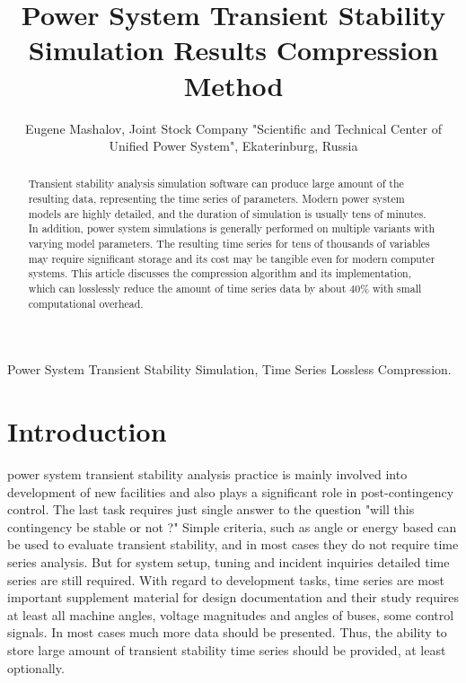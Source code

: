 \documentclass[lettersize,journal]{IEEEtran}
\begin{document}
\title{Power System Transient Stability Simulation Results Compression Method}

\author {Eugene Mashalov, Joint Stock Company "Scientific and Technical Center of Unified Power System", Ekaterinburg, Russia}




\maketitle

\begin{abstract}
Transient stability analysis simulation software can produce large amount of
the resulting data, representing the time series of parameters. Modern power system models
are highly detailed, and the duration of simulation is usually tens of minutes. 
In addition, power system simulations is generally performed on multiple variants with
varying model parameters. The resulting time series for tens of thousands of variables
may require significant storage and its cost may be tangible even for modern computer systems.
This article discusses the compression algorithm and its implementation, which can 
losslessly reduce the amount of time series data by about 40\% with small computational overhead.
\end{abstract}

\begin{IEEEkeywords}
Power System Transient Stability Simulation, Time Series Lossless Compression.
\end{IEEEkeywords}

\section{Introduction}
 power system transient stability analysis practice is mainly involved
into development of new facilities and also plays a significant role in post-contingency
control. The last task requires just single answer to the question "will this contingency be stable or not ?"
Simple criteria, such as angle or energy based can be used to evaluate transient stability, and in 
most cases they do not require time series analysis. But for system setup, tuning and incident inquiries
detailed time series are still required. With regard to development tasks, time series are most important
supplement material for design documentation and their study requires at least all machine angles, 
voltage magnitudes and angles of buses, some control signals. In most cases much more data should be presented. 
Thus, the ability to store large amount of transient stability time series should be provided, at least optionally.
\end{document}
